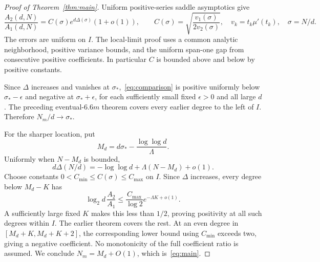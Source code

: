\documentclass[11pt,a4paper]{article}
\theoremstyle{remark}\newtheorem*{ednote}{Editorial note (ProveIt, 2026-10-01)}
\begin{document}
\begin{proof}[Proof of Theorem~\ref{thm:main}]
Uniform positive-series saddle asymptotics give
\begin{equation}\label{eq:ratio}
 \frac{A_2(d,N)}{A_1(d,N)}
 =C(\sigma)e^{d\Delta(\sigma)}(1+o(1)),\qquad
 C(\sigma)=\sqrt{\frac{v_1(\sigma)}{2v_2(\sigma)}},
 \quad v_k=t_k\mu'(t_k),\quad \sigma=N/d.
\end{equation}
The errors are uniform on $I$. The local-limit proof uses a common analytic neighborhood, positive variance bounds, and the uniform span-one gap from consecutive positive coefficients. In particular $C$ is bounded above and below by positive constants.

Since $\Delta$ increases and vanishes at $\sigma_*$,~\eqref{eq:comparison} is positive uniformly below $\sigma_*-\epsilon$ and negative at $\sigma_*+\epsilon$, for each sufficiently small fixed $\epsilon>0$ and all large $d$. The preceding eventual-$6.6m$ theorem covers every earlier degree to the left of $I$. Therefore $N_m/d\to\sigma_*$.

For the sharper location, put
\[
 M_d=d\sigma_*-\frac{\log\log d}{\Lambda}.
\]
Uniformly when $N-M_d$ is bounded,
\[
 d\Delta(N/d)=-\log\log d+\Lambda(N-M_d)+o(1).
\]
Choose constants $0<C_{\min}\le C(\sigma)\le C_{\max}$ on $I$. Since $\Delta$ increases, every degree below $M_d-K$ has
\[
 \log_2d\,\frac{A_2}{A_1}
 \le\frac{C_{\max}}{\log2}e^{-\Lambda K+o(1)}.
\]
A sufficiently large fixed $K$ makes this less than $1/2$, proving positivity at all such degrees within $I$. The earlier theorem covers the rest. At an even degree in $[M_d+K,M_d+K+2]$, the corresponding lower bound using $C_{\min}$ exceeds two, giving a negative coefficient. No monotonicity of the full coefficient ratio is assumed. We conclude $N_m=M_d+O(1)$, which is~\eqref{eq:main}.
\end{proof}
\end{document}
